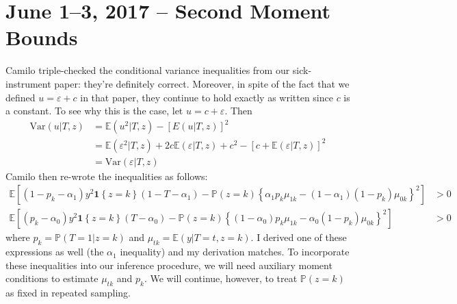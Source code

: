 \documentclass[12pt]{article}
\begin{document}
\section{June 1--3, 2017 -- Second Moment Bounds}
Camilo triple-checked the conditional variance inequalities from our sick-instrument paper: they're definitely correct.
Moreover, in spite of the fact that we defined $u = \varepsilon + c$ in that paper, they continue to hold exactly as written since $c$ is a constant.
To see why this is the case, let $u = c + \varepsilon$.
Then
\begin{align*}
  \mbox{Var}\left( u|T,z \right) &= \mathbb{E}(u^2|T,z) - \left[ E(u|T,z) \right]^2\\
&= \mathbb{E}(\varepsilon^2|T,z) + 2c\mathbb{E}(\varepsilon|T,z) + c^2 - \left[ c + \mathbb{E}(\varepsilon|T,z)  \right]^2\\
&= \mbox{Var}(\varepsilon|T,z)
\end{align*}
Camilo then re-wrote the inequalities as follows:
\begin{align*}
  \mathbb{E}\left[ (1- p_k - \alpha_1) y^2 \mathbf{1}\left\{ z=k \right\}(1 - T - \alpha_1) - \mathbb{P}(z=k)\left\{ \alpha_1 p_k \mu_{1k} - (1 - \alpha_1)(1 - p_k)\mu_{0k} \right\}^2 \right] &>0 \\
  \mathbb{E}\left[ (p_k - \alpha_0) y^2 \mathbf{1}\left\{ z=k \right\}(T - \alpha_0) - \mathbb{P}(z=k)\left\{ (1 - \alpha_0) p_k \mu_{1k} - \alpha_0(1 - p_k)\mu_{0k} \right\}^2 \right] &>0 
\end{align*}
where $p_k = \mathbb{P}(T=1|z=k)$ and $\mu_{tk} = \mathbb{E}(y|T=t,z=k)$.
I derived one of these expressions as well (the $\alpha_1$ inequality) and my derivation matches.
To incorporate these inequalities into our inference procedure, we will need auxiliary moment conditions to estimate $\mu_{tk}$ and $p_k$.
We will continue, however, to treat $\mathbb{P}(z=k)$ as fixed in repeated sampling.
\end{document}
